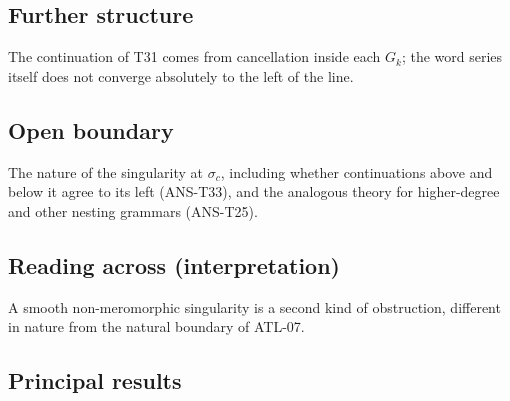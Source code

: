 \documentclass[
  11pt,
]{article}
\begin{document}
\hypertarget{further-structure-2}{%
\subsection{Further structure}\label{further-structure-2}}

The continuation of T31 comes from cancellation inside each \(G_k\); the
word series itself does not converge absolutely to the left of the line.

\hypertarget{open-boundary-2}{%
\subsection{Open boundary}\label{open-boundary-2}}

The nature of the singularity at \(\sigma_c\), including whether
continuations above and below it agree to its left (ANS-T33), and the
analogous theory for higher-degree and other nesting grammars (ANS-T25).

\hypertarget{reading-across-interpretation-2}{%
\subsection{Reading across
(interpretation)}\label{reading-across-interpretation-2}}

A smooth non-meromorphic singularity is a second kind of obstruction,
different in nature from the natural boundary of ATL-07.

\hypertarget{principal-results-2}{%
\subsection{Principal results}\label{principal-results-2}}
\end{document}
